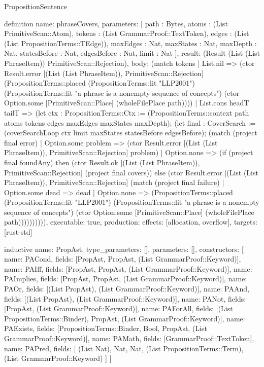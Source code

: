 \begin{lexlean}{PropositionSentence}
\begin{semanticmodule}
definition{
  name: phraseCovers,
  parameters: [
    path : Bytes,
    atoms : (List PrimitiveScan::Atom),
    tokens : (List GrammarProof::TextToken),
    edges : (List (List PropositionTerms::TEdge)),
    maxEdges : Nat,
    maxStates : Nat,
    maxDepth : Nat,
    statesBefore : Nat,
    edgesBefore : Nat,
    limit : Nat
  ],
  result: (Result (List (List PhraseItem)) PrimitiveScan::Rejection),
  body: (match tokens
    | List.nil => (ctor Result.error [(List (List PhraseItem)), PrimitiveScan::Rejection] (PropositionTerms::placed (PropositionTerms::lit "LLP2001") (PropositionTerms::lit "a phrase is a nonempty sequence of concepts") (ctor Option.some [PrimitiveScan::Place] (wholeFilePlace path))))
    | List.cons headT tailT => (let ctx : PropositionTerms::Ctx := (PropositionTerms::context path atoms tokens edges maxEdges maxStates maxDepth); (let final : CoverSearch := (coverSearchLoop ctx limit maxStates statesBefore edgesBefore); (match (project final error)
      | Option.some problem => (ctor Result.error [(List (List PhraseItem)), PrimitiveScan::Rejection] problem)
      | Option.none => (if (project final foundAny) then (ctor Result.ok [(List (List PhraseItem)), PrimitiveScan::Rejection] (project final covers)) else (ctor Result.error [(List (List PhraseItem)), PrimitiveScan::Rejection] (match (project final failure)
          | Option.some dead => dead
          | Option.none => (PropositionTerms::placed (PropositionTerms::lit "LLP2001") (PropositionTerms::lit "a phrase is a nonempty sequence of concepts") (ctor Option.some [PrimitiveScan::Place] (wholeFilePlace path)))))))))),
  executable: true,
  production: {effects: [allocation, overflow], targets: [rust-std]}
}

inductive{
  name: PropAst,
  type_parameters: [],
  parameters: [],
  constructors: [
    {name: PACond, fields: [PropAst, PropAst, (List GrammarProof::Keyword)]},
    {name: PAIff, fields: [PropAst, PropAst, (List GrammarProof::Keyword)]},
    {name: PAImplies, fields: [PropAst, PropAst, (List GrammarProof::Keyword)]},
    {name: PAOr, fields: [(List PropAst), (List GrammarProof::Keyword)]},
    {name: PAAnd, fields: [(List PropAst), (List GrammarProof::Keyword)]},
    {name: PANot, fields: [PropAst, (List GrammarProof::Keyword)]},
    {name: PAForAll, fields: [(List PropositionTerms::Binder), PropAst, (List GrammarProof::Keyword)]},
    {name: PAExists, fields: [PropositionTerms::Binder, Bool, PropAst, (List GrammarProof::Keyword)]},
    {name: PAMath, fields: [GrammarProof::TextToken]},
    {
      name: PAPred,
      fields: [
        (List Nat),
        Nat,
        Nat,
        (List PropositionTerms::Term),
        (List GrammarProof::Keyword)
      ]
    }
  ]
}


\end{semanticmodule}
\end{lexlean}
